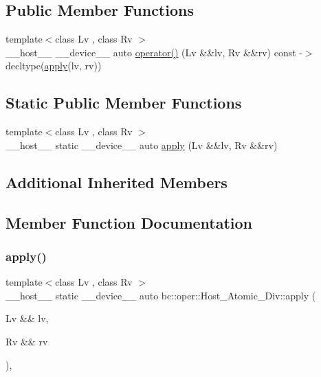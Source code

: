\subsection*{Public Member Functions}
\begin{DoxyCompactItemize}
\item 
{\footnotesize template$<$class Lv , class Rv $>$ }\\\+\_\+\+\_\+host\+\_\+\+\_\+ \+\_\+\+\_\+device\+\_\+\+\_\+ auto \hyperlink{structbc_1_1oper_1_1Host__Atomic__Div_a8ab2b70501a83617ef88b3ca3a4afd4c}{operator()} (Lv \&\&lv, Rv \&\&rv) const -\/$>$ decltype(\hyperlink{structbc_1_1oper_1_1Host__Atomic__Div_a5557f236a09a53011fe52e888c83d4fa}{apply}(lv, rv))
\end{DoxyCompactItemize}
\subsection*{Static Public Member Functions}
\begin{DoxyCompactItemize}
\item 
{\footnotesize template$<$class Lv , class Rv $>$ }\\\+\_\+\+\_\+host\+\_\+\+\_\+ static \+\_\+\+\_\+device\+\_\+\+\_\+ auto \hyperlink{structbc_1_1oper_1_1Host__Atomic__Div_a5557f236a09a53011fe52e888c83d4fa}{apply} (Lv \&\&lv, Rv \&\&rv)
\end{DoxyCompactItemize}
\subsection*{Additional Inherited Members}


\subsection{Member Function Documentation}
\mbox{\label{structbc_1_1oper_1_1Host__Atomic__Div_a5557f236a09a53011fe52e888c83d4fa}} 
\subsubsection{\texorpdfstring{apply()}{apply()}}
{\footnotesize\ttfamily template$<$class Lv , class Rv $>$ \\
\+\_\+\+\_\+host\+\_\+\+\_\+ static \+\_\+\+\_\+device\+\_\+\+\_\+ auto bc\+::oper\+::\+Host\+\_\+\+Atomic\+\_\+\+Div\+::apply (\begin{DoxyParamCaption}\item[{Lv \&\&}]{lv,  }\item[{Rv \&\&}]{rv }\end{DoxyParamCaption})\hspace{0.3cm}{\ttfamily [inline]}, {\ttfamily [static]}}

